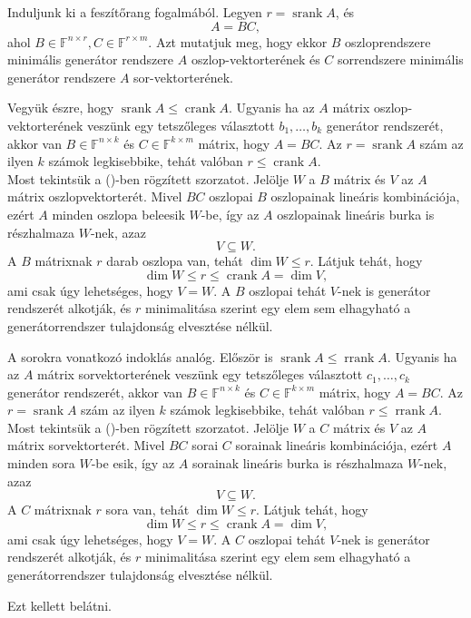 \documentclass[9pt, showtrims]{memoir}
\makeatletter
\renewenvironment{proof}[1][\proofname]
    {\par\pushQED{\qed}%
    \normalfont \topsep6\p@\@plus6\p@\relax
    \trivlist
    \item[\hskip\labelsep
        \itshape
    #1\@addpunct{:}]\ignorespaces}
    {\popQED\endtrivlist\@endpefalse}
\theoremstyle{plain}
\theoremstyle{remark}
\theoremstyle{definition}
\renewcommand{\mathbf}{\mathbb}
\DeclareMathOperator{\crank}{crank}
\DeclareMathOperator{\rrank}{rrank}
\DeclareMathOperator{\srank}{srank}
\makeatother
\begin{document}
\begin{proof}
    Induljunk ki a feszítőrang fogalmából.
    Legyen $r=\srank{A}$, és 
    \[
        A=BC,\tag{\dag}
    \]
    ahol $B\in\mathbf{F}^{n\times r},C\in\mathbf{F}^{r\times m}$.
    Azt mutatjuk meg, hogy ekkor $B$ oszloprendszere minimális generátor rendszere $A$ oszlop-vektorterének
    és $C$ sorrendszere minimális generátor rendszere $A$ sor-vektorterének.

    Vegyük észre, hogy $\srank{A}\leq \crank{A}$.
    Ugyanis ha az $A$ mátrix oszlop-vektorterének veszünk egy tetszőleges választott
    $b_1,\dots,b_k$ generátor rendszerét, 
    akkor van $B\in\mathbf{F}^{n\times k}$ és $C\in\mathbf{F}^{k\times m}$ mátrix, hogy $A=BC$.
    Az $r=\srank{A}$ szám az ilyen $k$ számok legkisebbike, tehát valóban $r\leq\crank{A}$.
    \\
    Most tekintsük a (\dag)-ben rögzített szorzatot.
    Jelölje $W$ a $B$ mátrix és $V$ az $A$ mátrix oszlopvektorterét.
    Mivel $BC$ oszlopai $B$ oszlopainak lineáris kombinációja, 
    ezért $A$ minden oszlopa beleesik $W$-be, 
    így az $A$ oszlopainak lineáris burka is részhalmaza $W$-nek,
    azaz 
    \[
        V\subseteq W.
    \]
    A $B$ mátrixnak $r$ darab oszlopa van, 
    tehát $\dim W\leq r$.
    Látjuk tehát, hogy 
    \[\dim W\leq r\leq\crank{A}=\dim V,
    \]
    ami csak úgy lehetséges, 
    hogy $V=W$.
    A $B$ oszlopai tehát $V$-nek is generátor rendszerét alkotják,
    és $r$ minimalitása szerint egy elem sem elhagyható a generátorrendszer tulajdonság
    elvesztése nélkül.

    A sorokra vonatkozó indoklás analóg.
    Először is $\srank{A}\leq \rrank{A}$.
    Ugyanis ha az $A$ mátrix sorvektorterének veszünk egy tetszőleges választott
    $c_1,\dots,c_k$ generátor rendszerét, 
    akkor van $B\in\mathbf{F}^{n\times k}$ és $C\in\mathbf{F}^{k\times m}$ mátrix, hogy $A=BC$.
    Az $r=\srank{A}$ szám az ilyen $k$ számok legkisebbike, tehát valóban $r\leq\rrank{A}$.
    \\
    Most tekintsük a (\dag)-ben rögzített szorzatot.
    Jelölje $W$ a $C$ mátrix és $V$ az $A$ mátrix sorvektorterét.
    Mivel $BC$ sorai $C$ sorainak lineáris kombinációja, 
    ezért $A$ minden sora $W$-be esik,
    így az $A$ sorainak lineáris burka is részhalmaza $W$-nek,
    azaz 
    \[
        V\subseteq W.
    \]
    A $C$ mátrixnak $r$ sora van, 
    tehát $\dim W\leq r$.
    Látjuk tehát, hogy 
    \[\dim W\leq r\leq\crank{A}=\dim V,
    \]
    ami csak úgy lehetséges, 
    hogy $V=W$.
    A $C$ oszlopai tehát $V$-nek is generátor rendszerét alkotják,
    és $r$ minimalitása szerint egy elem sem elhagyható a generátorrendszer tulajdonság
    elvesztése nélkül.

    Ezt kellett belátni. 
\end{proof}
\end{document}
